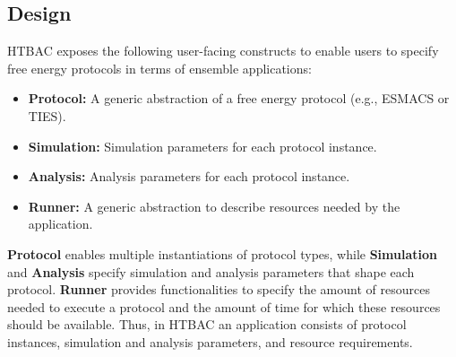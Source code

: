 



\subsection{Design}

HTBAC exposes the following user-facing constructs to enable users to specify
free energy protocols in terms of ensemble applications:

\begin{itemize}
  \item \textbf{Protocol:} A generic abstraction of a free energy protocol
  (e.g., ESMACS or TIES).
  \item \textbf{Simulation:} Simulation parameters for each protocol
  instance.
  \item \textbf{Analysis:} Analysis parameters for each protocol instance.
  \item \textbf{Runner:} A generic abstraction to describe resources needed
  by the application.
\end{itemize}

\textbf{Protocol} enables multiple instantiations of protocol types, while
\textbf{Simulation} and \textbf{Analysis} specify simulation and analysis
parameters that shape each protocol. \textbf{Runner} provides functionalities
to specify the amount of resources needed to execute a protocol and the
amount of time for which these resources should be available. Thus, in HTBAC an
application consists of protocol instances, simulation and analysis
parameters, and resource requirements.

